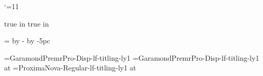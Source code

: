 \catcode`\@=11
%
%

\newdimen\textblock@top
\newdimen\textblock@odd@left
\newdimen\textblock@even@left

\def\settextblockposition#1#2{%
  \textblock@odd@left=#1
  \textblock@even@left=\pdfpagewidth
    \advance\textblock@even@left by -\hsize
    \advance\textblock@even@left by -#1
  \textblock@top=#2
}

\pdfhorigin=0pt
\pdfvorigin=0pt
 true in
 true in
\hsize=22pc
\vsize=39pc

\settextblockposition{5pc}{4.5pc}

%
%

\newif\if@cleared@page
\newif\if@display@page

\def\facingpages{%
  \if@cleared@page\headline={\line{}}\footline={\line{}}\fi%
  \if@display@page\headline={\line{}}\footline={\displaypagefootline}\fi%
  \global\@cleared@pagefalse%
  \global\@display@pagefalse%
  \dimen0=\ifodd\pageno\textblock@odd@left\else\textblock@even@left\fi%
  \shipout\vbox{\moveright\dimen0\vbox{\vskip\textblock@top\makeheadline\pagebody\makefootline}}%
  \advancepageno%
  \ifnum\outputpenalty>-20000 \else\dosupereject\fi%
}
\output{\facingpages}

%
%

\def\usefont#1{#1\baselineskip=\fontdimen6#1}


\newdimen\booktitlesize \booktitlesize=36pt
\newdimen\aheadsize \aheadsize=24pt
\newdimen\bheadsize \bheadsize=18pt

\newdimen\textsize \textsize=11pt
\newdimen\smalltextsize \smalltextsize=10pt
\newdimen\pageframesize \pageframesize=8pt

\font\booktitlefont=GaramondPremrPro-Disp-lf-titling-ly1
\font\authornamefont=GaramondPremrPro-Disp-lf-titling-ly1 at \aheadsize
\font\logofont=ProximaNova-Regular-lf-titling-ly1 at \bheadsize

